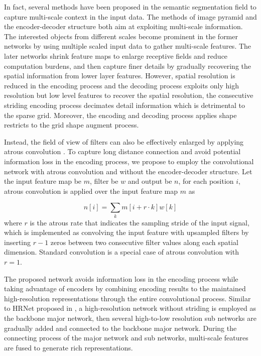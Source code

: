 \documentclass[10pt,twocolumn,letterpaper]{article}
\begin{document}
In fact, several methods have been proposed in the semantic segmentation field to capture multi-scale context in the input data. The methods of image pyramid and the encoder-decoder structure both aim at exploiting multi-scale information. The interested objects from different scales become prominent in the former networks by using multiple scaled input data to gather multi-scale features. The later networks shrink feature maps to enlarge receptive fields and reduce computation burdens, and then capture finer details by gradually recovering the spatial information from lower layer features. However, spatial resolution is reduced in the encoding process and the decoding process exploits only high resolution but low level features to recover the spatial resolution, the consecutive striding encoding process decimates detail information which is detrimental to the sparse grid. Moreover, the encoding and decoding process applies shape restricts to the grid shape augment process. 

Instead, the field of view of filters can also be effectively enlarged by applying atrous convolution \cite{deeplab, deeplabv1, deeplabv3, deeplabv3p}. To capture long distance connection and avoid potential information loss in the encoding process, we propose to employ the convolutional network with atrous convolution and without the encoder-decoder structure. Let the input feature map be $m$, filter be $w$ and output be $n$, for each position $i$, atrous convolution is applied over the input feature map $m$ as 

\begin{equation}
n[i] = \sum_k m[i+r\cdot k]w[k]
\end{equation}
where $r$ is the atrous rate that indicates the sampling stride of the input signal, which is implemented as convolving the input feature with upsampled filters by inserting $r-1$ zeros between two consecutive filter values along each spatial dimension. Standard convolution is a special case of atrous convolution with $r=1$.

The proposed network avoids information loss in the encoding process while taking advantage of encoders by combining encoding results to the maintained high-resolution representations through the entire convolutional process. Similar to HRNet proposed in \cite{hrnet}, a high-resolution network without striding is employed as the backbone major network, then several high-to-low resolution sub networks are gradually added and connected to the backbone major network. During the connecting process of the major network and sub networks, multi-scale features are fused to generate rich representations.
\end{document}
